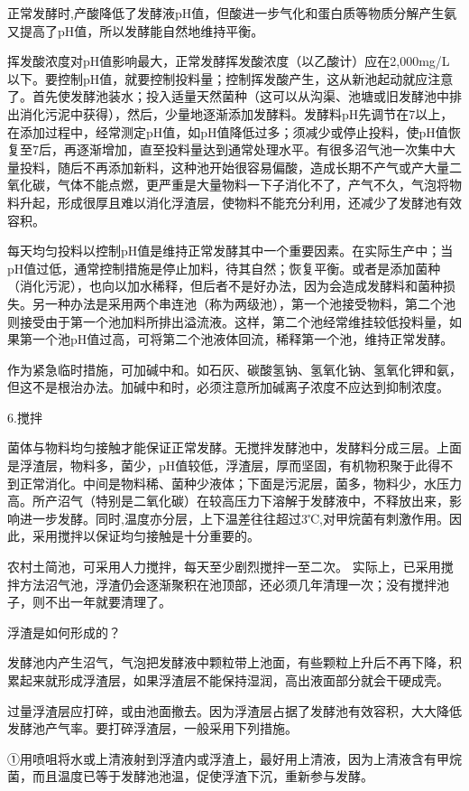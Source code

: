 \documentclass{ctexbook}
\begin{document}
正常发酵时,产酸降低了发酵液pH值，但酸进一步气化和蛋白质等物质分解产生氨又提高了pH值，所以发酵能自然地维持平衡。

挥发酸浓度对pH值影响最大，正常发酵挥发酸浓度（以乙酸计）应在2,000mg/L以下。要控制pH值，就要控制投料量；控制挥发酸产生，这从新池起动就应注意了。首先使发酵池装水；投入适量天然菌种（这可以从沟渠、池塘或旧发酵池中排出消化污泥中获得），然后，少量地逐渐添加发酵料。发酵料pH先调节在7以上，在添加过程中，经常测定pH值，如pH值降低过多；须减少或停止投料，使pH值恢复至7后，再逐渐增加，直至投料量达到通常处理水平。有很多沼气池一次集中大量投料，随后不再添加新料，这种池开始很容易偏酸，造成长期不产气或产大量二氧化碳，气体不能点燃，更严重是大量物料一下子消化不了，产气不久，气泡将物料升起，形成很厚且难以消化浮渣层，使物料不能充分利用，还减少了发酵池有效容积。

每天均匀投料以控制pH值是维持正常发酵其中一个重要因素。在实际生产中；当pH值过低，通常控制措施是停止加料，待其自然；恢复平衡。或者是添加菌种（消化污泥），也向以加水稀释，但后者不是好办法，因为会造成发酵料和菌种损失。另一种办法是采用两个串连池（称为两级池），第一个池接受物料，第二个池则接受由于第一个池加料所排出溢流液。这样，第二个池经常维挂较低投料量，如果第一个池pH值过高，可将第二个池液体回流，稀释第一个池，维持正常发酵。

作为紧急临时措施，可加碱中和。如石灰、碳酸氢钠、氢氧化钠、氢氧化钾和氨，但这不是根治办法。加碱中和时，必须注意所加碱离子浓度不应达到抑制浓度。

6.搅拌

菌体与物料均匀接触才能保证正常发酵。无搅拌发酵池中，发酵料分成三层。上面是浮渣层，物料多，菌少，pH值较低，浮渣层，厚而坚固，有机物积聚于此得不到正常消化。中间是物料稀、菌种少液体；下面是污泥层，菌多，物料少，水压力高。所产沼气（特别是二氧化碳）在较高压力下溶解于发酵液中，不释放出来，影响进一步发酵。同时,温度亦分层，上下温差往往超过3℃,对甲烷菌有刺激作用。因此，采用搅拌以保证均匀接触是十分重要的。

农村土简池，可采用人力搅拌，每天至少剧烈搅拌一至二次。
实际上，已采用搅拌方法沼气池，浮渣仍会逐渐聚积在池顶部，还必须几年清理一次；没有搅拌池子，则不出一年就要清理了。

浮渣是如何形成的？

发酵池内产生沼气，气泡把发酵液中颗粒带上池面，有些颗粒上升后不再下降，积累起来就形成浮渣层，如果浮渣层不能保持湿润，高出液面部分就会干硬成壳。

过量浮渣层应打碎，或由池面撤去。因为浮渣层占据了发酵池有效容积，大大降低发酵池产气率。要打碎浮渣层，一般采用下列措施。

①用喷咀将水或上清液射到浮渣内或浮渣上，最好用上清液，因为上清液含有甲烷菌，而且温度已等于发酵池池温，促使浮渣下沉，重新参与发酵。
\end{document}

